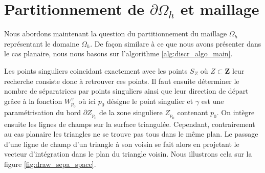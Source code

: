 \section{Partitionnement de $\partial\Omega_h$ et maillage}

Nous abordons maintenant la question du partitionnement du maillage $\Omega_h$ représentant le domaine $\Omega_h$. De façon similare à ce que nous avons présenter dans le cas planaire, nous nous basons sur l'algorithme \ref{alg:discr_algo_main}.

Les points singuliers coincidant exactement avec les points $S_Z$ où $Z\subset\mathbf{Z}$ leur recherche consiste donc à retrouver ces points. Il faut ensuite déterminer le nombre de séparatrices par points singuliers ainsi que leur direction de départ grâce à la fonction $W_{p_0}^\gamma$ où ici $p_0$ désigne le point singulier et $\gamma$ est une paramétrisation du bord $\partial Z_{p_0}$ de la zone singuliere $Z_{p_0}$ contenant $p_0$. On intègre ensuite les lignes de champs sur la surface triangulée. Cependant, contrairement au cas planaire les triangles ne se trouve pas tous dans le même plan. Le passage d'une ligne de champ d'un triangle à son voisin se fait alors en projetant le vecteur d'intégration dans le plan du triangle voisin. Nous illustrons cela sur la figure
\ref{fig:draw_sepa_space}.

